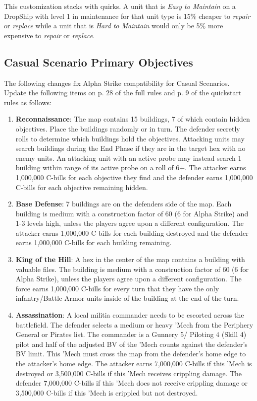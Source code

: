 This customization stacks with quirks.
A unit that is \emph{Easy to Maintain} on a DropShip with level 1 in maintenance for that unit type is 15\% cheaper to \emph{repair} or \emph{replace} while a unit that is \emph{Hard to Maintain} would only be 5\% more expensive to \emph{repair} or \emph{replace}.

\subsection{Casual Scenario Primary Objectives}

The following changes fix Alpha Strike compatibility for Casual Scenarios.
Update the following items on p. 28 of the full rules and p. 9 of the quickstart rules  as follows:

\begin{enumerate}

\item {\bfseries Reconnaissance}: The map contains 15 buildings, 7 of which contain hidden objectives.
Place the buildings randomly or in turn.
The defender secretly rolls to determine which buildings hold the objectives.
Attacking units may search buildings during the End Phase if they are in the target hex with no enemy units.
An attacking unit with an active probe may instead search 1 building within range of its active probe on a roll of 6+.
The attacker earns 1,000,000 C-bills for each objective they find and the defender earns 1,000,000 C-bills for each objective remaining hidden.

\setcounter{enumi}{3}
\item {\bfseries Base Defense}: 7 buildings are on the defenders side of the map.
Each building is medium with a construction factor of 60 (6 for Alpha Strike) and 1-3 levels high, unless the players agree upon a different configuration.
The attacker earns 1,000,000 C-bills for each building destroyed and the defender earns 1,000,000 C-bills for each building remaining.

\item {\bfseries King of the Hill}: A hex in the center of the map contains a building with valuable files.
The building is medium with a construction factor of 60 (6 for Alpha Strike), unless the players agree upon a different configuration.
The force earns 1,000,000 C-bills for every turn that they have the only infantry/Battle Armor units inside of the building at the end of the turn.

\item {\bfseries Assassination}: A local militia commander needs to be escorted across the battlefield.
The defender selects a medium or heavy 'Mech from the Periphery General or Pirates list.
The commander is a Gunnery 5/ Piloting 4 (Skill 4) pilot and half of the adjusted BV of the 'Mech counts against the defender's BV limit.
This 'Mech must cross the map from the defender's home edge to the attacker's home edge.
The attacker earns 7,000,000 C-bills if this 'Mech is destroyed or 3,500,000 C-bills if this 'Mech receives crippling damage.
The defender 7,000,000 C-bills if this 'Mech does not receive crippling damage or 3,500,000 C-bills if this 'Mech is crippled but not destroyed.

\end{enumerate}
